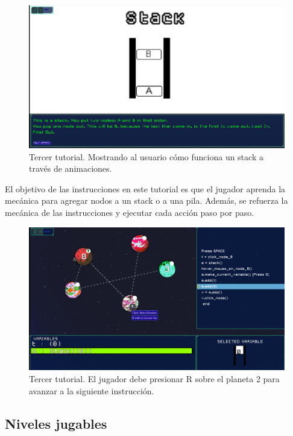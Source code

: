 \begin{figure}[h]
	\centering
	\includegraphics[scale=0.3]{imagenes/ThirdTutorialStackExplanation.png}
	\caption{Tercer tutorial. Mostrando al usuario cómo funciona un stack a través de animaciones.}
	\label{ThirdTutorialStackExplanation}
\end{figure}


El objetivo de las instrucciones en este tutorial es que el jugador aprenda la mecánica para agregar nodos a un stack o a una pila. Además, se refuerza la mecánica de las instrucciones y ejecutar cada acción paso por paso.


\begin{figure}[h]
	\centering
	\includegraphics[scale=0.3]{imagenes/ThirdTutorialAddingNode.png}
	\caption{Tercer tutorial. El jugador debe presionar R sobre el planeta 2 para avanzar a la siguiente instrucción.}
	\label{ThirdTutorialAddingNodesToStacks}
\end{figure}


\subsection{Niveles jugables}

